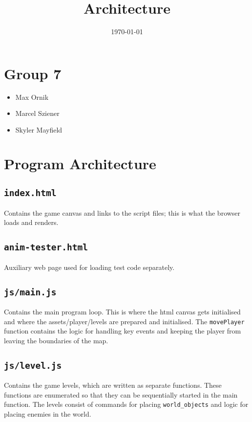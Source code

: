 \documentclass[11pt]{article}
\date{\today}
\title{Architecture}
\begin{document}
\maketitle
\tableofcontents


\section{Group 7}
\label{sec:orgd5d011a}
\begin{itemize}
\item Max Ornik\\
\item Marcel Sziener\\
\item Skyler Mayfield\\
\end{itemize}

\section{Program Architecture}
\label{sec:org422a9f4}
\subsection{\texttt{index.html}}
\label{sec:org6ded173}
Contains the game canvas and links to the script files; this is what the browser loads and renders.\\
\subsection{\texttt{anim-tester.html}}
\label{sec:org1e37437}
Auxiliary web page used for loading test code separately.\\
\subsection{\texttt{js/main.js}}
\label{sec:org579b95b}
Contains the main program loop. This is where the html canvas gets initialised and where the assets/player/levels are prepared and initialised. The \texttt{movePlayer} function contains the logic for handling key events and keeping the player from leaving the boundaries of the map.\\
\subsection{\texttt{js/level.js}}
\label{sec:org492efbd}
Contains the game levels, which are written as separate functions. These functions are enumerated so that they can be sequentially started in the main function. The levels consist of commands for placing \texttt{world\_objects} and logic for placing enemies in the world.\\
\end{document}

